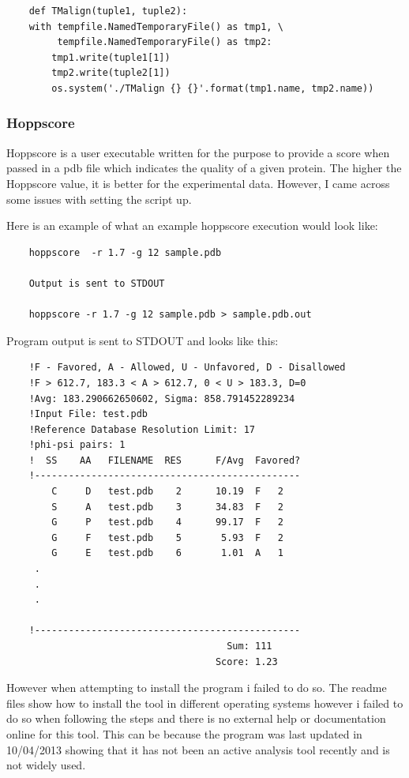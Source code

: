 \documentclass[]{final_report}
\begin{document}
\begin{lstlisting}
    def TMalign(tuple1, tuple2):
    with tempfile.NamedTemporaryFile() as tmp1, \
         tempfile.NamedTemporaryFile() as tmp2:
        tmp1.write(tuple1[1])
        tmp2.write(tuple2[1])
        os.system('./TMalign {} {}'.format(tmp1.name, tmp2.name))
\end{lstlisting}

\clearpage

\subsubsection{Hoppscore}

Hoppscore is a user executable written for the purpose to provide a score when passed in a pdb file which indicates the quality of a given protein. The higher the Hoppscore value, it is better for the experimental data. However, I came across some issues with setting the script up.

Here is an example of what an example hoppscore execution would look like:

\begin{lstlisting}
    hoppscore  -r 1.7 -g 12 sample.pdb 

    Output is sent to STDOUT

    hoppscore -r 1.7 -g 12 sample.pdb > sample.pdb.out
\end{lstlisting}

Program output is sent to STDOUT and looks like this:

\begin{lstlisting}
    !F - Favored, A - Allowed, U - Unfavored, D - Disallowed
    !F > 612.7, 183.3 < A > 612.7, 0 < U > 183.3, D=0
    !Avg: 183.290662650602, Sigma: 858.791452289234
    !Input File: test.pdb
    !Reference Database Resolution Limit: 17
    !phi-psi pairs: 1
    !  SS    AA   FILENAME  RES      F/Avg  Favored?
    !-----------------------------------------------
        C     D   test.pdb    2      10.19  F   2
        S     A   test.pdb    3      34.83  F   2
        G     P   test.pdb    4      99.17  F   2
        G     F   test.pdb    5       5.93  F   2
        G     E   test.pdb    6       1.01  A   1
     .
     .
     .

    !-----------------------------------------------
                                       Sum: 111
                                     Score: 1.23
\end{lstlisting}

However when attempting to install the program i failed to do so. The readme files show how to install the tool in different operating systems however i failed to do so when following the steps and there is no external help or documentation online for this tool. This can be because the program was last updated in 10/04/2013 showing that it has not been an active analysis tool recently and is not widely used.
\clearpage
\end{document}
